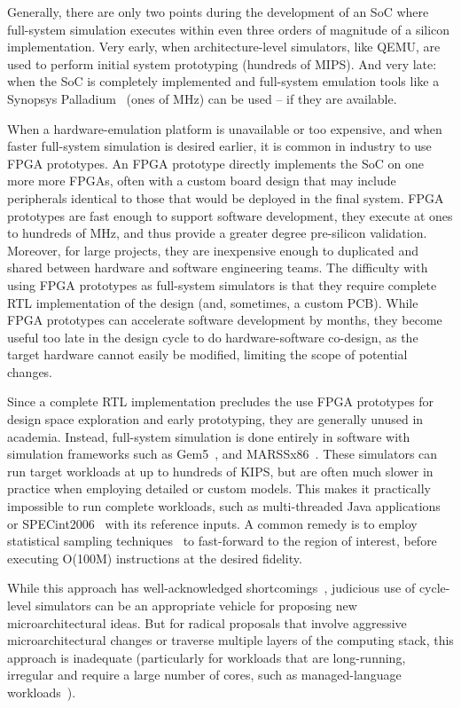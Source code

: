 Generally, there are only two points during the development of an SoC where
full-system simulation executes within even three orders of magnitude of a
silicon implementation. Very early, when architecture-level simulators, like QEMU\cite{qemu}, are used
to perform initial system prototyping (hundreds of MIPS). And very late: when
the SoC is completely implemented and full-system emulation tools like a
Synopsys Palladium~\cite{palladium} (ones of MHz) can be used -- if they are
available.

When a hardware-emulation platform is unavailable or too expensive, and when
faster full-system simulation is desired earlier, it is common in industry to
use FPGA prototypes. An FPGA prototype directly implements the SoC on
one more more FPGAs, often with a custom board design that may include
peripherals identical to those that would be deployed in the final system. FPGA
prototypes are fast enough to support software development, they execute at ones to hundreds of
MHz, and thus provide a greater degree pre-silicon validation. Moreover, for large
projects, they are inexpensive enough to duplicated and shared between hardware
and software engineering teams.  The difficulty with using FPGA prototypes as
full-system simulators is that they require complete RTL implementation of the
design (and, sometimes, a custom PCB). While FPGA prototypes can accelerate
software development by months, they become useful too late in the design cycle
to do hardware-software co-design, as the target hardware cannot easily be
modified, limiting the scope of potential changes.

Since a complete RTL implementation precludes the use FPGA prototypes for
design space exploration and early prototyping, they are generally unused in
academia. Instead, full-system simulation is done entirely in software with
simulation frameworks such as Gem5~\cite{gem5}, and MARSSx86~\cite{marssx86}.
These simulators can run target workloads at up to hundreds of KIPS, but are
often much slower in practice when employing detailed or custom models. This
makes it practically impossible to run complete workloads, such as
multi-threaded Java applications or SPECint2006~\cite{spec} with its reference
inputs. A common remedy is to employ statistical sampling
techniques~\cite{smarts} to fast-forward to the region of interest, before
executing O(100M) instructions at the desired fidelity.

While this approach has well-acknowledged shortcomings~\cite{gem5error},
judicious use of cycle-level simulators can be an appropriate vehicle for
proposing new microarchitectural ideas. But for radical proposals that involve
aggressive microarchitectural changes or traverse multiple layers of the
computing stack, this approach is inadequate (particularly for workloads that
are long-running, irregular and require a large number of cores, such as
managed-language workloads~\cite{MicroSimPanel}).

